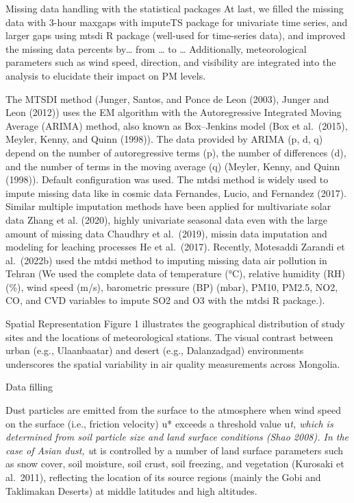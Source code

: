 \documentclass[
  11pt,
]{article}
\begin{document}
Missing data handling with the statistical packages At last, we filled
the missing data with 3-hour maxgaps with imputeTS package for
univariate time series, and larger gaps using mtsdi R package (well-used
for time-series data), and improved the missing data percents by\ldots{}
from \ldots{} to \ldots{} Additionally, meteorological parameters such
as wind speed, direction, and visibility are integrated into the
analysis to elucidate their impact on PM levels.

The MTSDI method (Junger, Santos, and Ponce de Leon (2003), Junger and
Leon (2012)) uses the EM algorithm with the Autoregressive Integrated
Moving Average (ARIMA) method, also known as Box--Jenkins model (Box et
al.~(2015), Meyler, Kenny, and Quinn (1998)). The data provided by ARIMA
(p, d, q) depend on the number of autoregressive terms (p), the number
of differences (d), and the number of terms in the moving average (q)
(Meyler, Kenny, and Quinn (1998)). Default configuration was used. The
mtdsi method is widely used to impute missing data like in cosmic data
Fernandes, Lucio, and Fernandez (2017). Similar multiple imputation
methods have been applied for multivariate solar data Zhang et al.
(2020), highly univariate seasonal data even with the large amount of
missing data Chaudhry et al.~(2019), missin data imputation and modeling
for leaching processes He et al.~(2017). Recently, Motesaddi Zarandi et
al.~(2022b) used the mtdsi method to imputing missing data air pollution
in Tehran (We used the complete data of temperature (°C), relative
humidity (RH) (\%), wind speed (m/s), barometric pressure (BP) (mbar),
PM10, PM2.5, NO2, CO, and CVD variables to impute SO2 and O3 with the
mtdsi R package.).

Spatial Representation Figure 1 illustrates the geographical
distribution of study sites and the locations of meteorological
stations. The visual contrast between urban (e.g., Ulaanbaatar) and
desert (e.g., Dalanzadgad) environments underscores the spatial
variability in air quality measurements across Mongolia.

Data filling

Dust particles are emitted from the surface to the atmosphere when wind
speed on the surface (i.e., friction velocity) u* exceeds a threshold
value u\emph{t, which is determined from soil particle size and land
surface conditions (Shao 2008). In the case of Asian dust, u}t is
controlled by a number of land surface parameters such as snow cover,
soil moisture, soil crust, soil freezing, and vegetation (Kurosaki et
al.~2011), reflecting the location of its source regions (mainly the
Gobi and Taklimakan Deserts) at middle latitudes and high altitudes.
\end{document}
